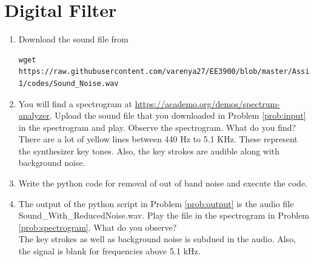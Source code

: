 \documentclass[journal,12pt,twocolumn]{IEEEtran}
\renewcommand\thesection{\arabic{section}}
\begin{document}
\section{Digital Filter}
\begin{enumerate}[label=\thesection.\arabic*
,ref=\thesection.\theenumi]
\item
\label{prob:input}
Download the sound file from  
\begin{lstlisting}
wget https://raw.githubusercontent.com/varenya27/EE3900/blob/master/Assignment-1/codes/Sound_Noise.wav
\end{lstlisting}
\item
\label{prob:spectrogram}
You will find a spectrogram at \href{https://academo.org/demos/spectrum-analyzer}{\url{https://academo.org/demos/spectrum-analyzer}}. 
%
Upload the sound file that you downloaded in Problem \ref{prob:input} in the spectrogram  and play.  Observe the spectrogram. What do you find?
\\
%
\solution There are a lot of yellow lines between 440 Hz to 5.1 KHz.  These represent the synthesizer key tones. Also, the key strokes
are audible along with background noise.
\item
\label{prob:output}
Write the python code for removal of out of band noise and execute the code.
\\
\solution

% 
\item
The output of the python script in Problem \ref{prob:output} is the audio file Sound\_With\_ReducedNoise.wav. Play the file in the spectrogram in Problem \ref{prob:spectrogram}. What do you observe?
\\
\solution The key strokes as well as background noise is subdued in the audio.  Also,  the signal is blank for frequencies above 5.1 kHz.

\end{enumerate}
\end{document}
